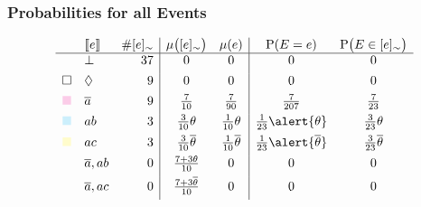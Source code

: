 \documentclass[bigger]{beamer}
\newcommand{\at}[1]{\ensuremath{\!\del{#1}}}
\newcommand{\class}[1]{\ensuremath{[{#1}]_{\sim}}}
\newcommand{\co}[1]{\ensuremath{\overline{#1}}}
\newcommand{\inconsistent}{\bot}
\newcommand{\indepclass}{\ensuremath{\Diamond}}
\newcommand{\pr}[1]{\ensuremath{\mathrm{P}\at{#1}}}
\newcommand{\pw}[1]{\ensuremath{\mu\at{#1}}}
\newcommand{\stablecore}[1]{\ensuremath{\left\llbracket #1 \right\rrbracket}}
\begin{document}
%
\begin{frame}
    \frametitle{Probabilities for all Events}
    \vfill

    \begin{equation*}
        \begin{array}{clr|cc|cc}
            & \stablecore{e}
            & \# \class{e}
            & \pw{\class{e}}
            & \pw{e}
            & \pr{E = e}
            & \pr{E \in \class{e}}
            \\
            \hline
            & \inconsistent
            & 37
            & 0
            & 0
            & 0
            & 0
            \\[4pt]
            \square 
            & \indepclass
            & 9
            & 0
            & 0
            & 0
            & 0
            \\[4pt]
            {\color{magenta!20}\blacksquare }
            & \co{a}
            & 9
            & \frac{7}{10}
            & \frac{7}{90}
            & \frac{7}{207}
            & \frac{7}{23}
            \\[4pt]
            {\color{cyan!20}\blacksquare }
            & ab
            & 3
            & \frac{3}{10}\theta
            & \frac{1}{10}\theta
            & \frac{1}{23}\alert{\theta}
            & \frac{3}{23}\theta
            \\[4pt]
            {\color{yellow!20}\blacksquare }
            & ac
            & 3
            & \frac{3}{10}\co{\theta}
            & \frac{1}{10}\co{\theta}
            & \frac{1}{23}\alert{\co{\theta}}
            & \frac{3}{23}\co{\theta}
            \\[4pt]
            & \co{a}, ab
            & 0
            & \frac{7 + 3\theta}{10}
            & 0
            & 0
            & 0
            \\[4pt]
            & \co{a}, ac
            & 0
            & \frac{7 + 3\co{\theta}}{10}
            & 0
            & 0
            & 0
            \\[4pt]

\end{array}
\end{equation*}
\end{frame}
\end{document}
